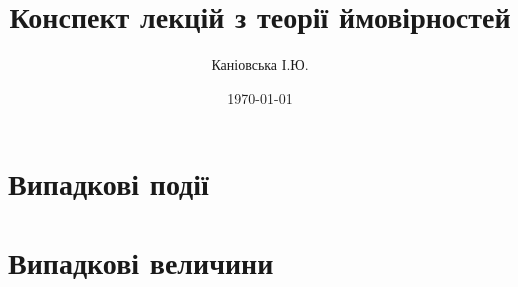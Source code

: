\documentclass{report}
\author{Каніовська І.Ю.}
\title{Конспект лекцій з теорії ймовірностей}
\date{\today}
\begin{document}
 
    \maketitle
    \tableofcontents
    \chapter{Випадкові події}
        
        
        
        
    \chapter{Випадкові величини}
        
        
        
\end{document}
